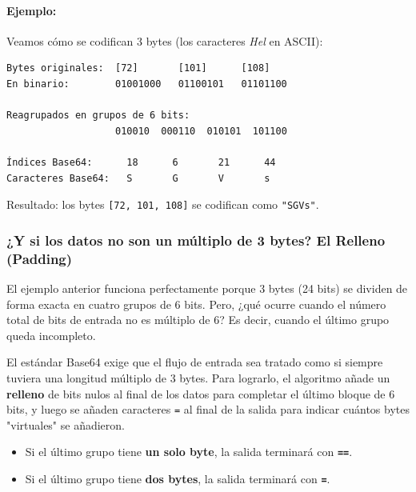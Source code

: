 \paragraph{Ejemplo:}
Veamos cómo se codifican 3 bytes (los caracteres \emph{Hel} en ASCII):
\begin{lstlisting}[basicstyle=\ttfamily\small]
Bytes originales:  [72]       [101]      [108]
En binario:        01001000   01100101   01101100

Reagrupados en grupos de 6 bits:
                   010010  000110  010101  101100

Índices Base64:      18      6       21      44
Caracteres Base64:   S       G       V       s
\end{lstlisting}
Resultado: los bytes \texttt{[72, 101, 108]} se codifican como \texttt{"SGVs"}.

\subsubsection*{¿Y si los datos no son un múltiplo de 3 bytes? El Relleno (Padding)}
El ejemplo anterior funciona perfectamente porque 3 bytes (24 bits) se dividen de forma exacta en cuatro grupos de 6 bits. Pero, ¿qué ocurre cuando el número total de bits de entrada no es múltiplo de 6? Es decir, cuando el último grupo queda incompleto.

El estándar Base64 exige que el flujo de entrada sea tratado como si siempre tuviera una longitud múltiplo de 3 bytes. Para lograrlo, el algoritmo añade un \textbf{relleno} de bits nulos al final de los datos para completar el último bloque de 6 bits, y luego se añaden caracteres \texttt{=} al final de la salida para indicar cuántos bytes "virtuales" se añadieron.

\begin{itemize}
    \item Si el último grupo tiene \textbf{un solo byte}, la salida terminará con \textbf{\texttt{==}}.
    \item Si el último grupo tiene \textbf{dos bytes}, la salida terminará con \textbf{\texttt{=}}.
\end{itemize}

